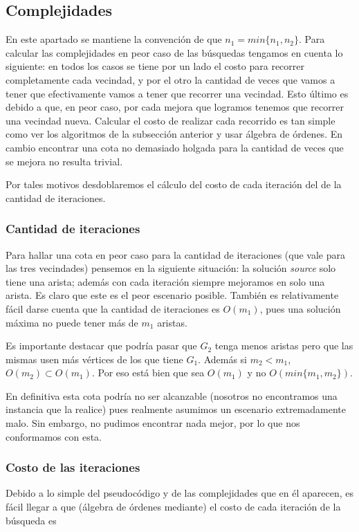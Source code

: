 \subsection{Complejidades}
En este apartado se mantiene la convención de que $n_1 = min\{n_1, n_2\}$.
Para calcular las complejidades en peor caso de las búsquedas tengamos en cuenta lo siguiente: en todos los casos se tiene por un lado el costo para recorrer completamente cada vecindad, y por el otro la cantidad de veces que vamos a tener que efectivamente vamos a tener que recorrer una vecindad. Esto último es debido a que, en peor caso, por cada mejora que logramos tenemos que recorrer una vecindad nueva. Calcular el costo de realizar cada recorrido es tan simple como ver los algoritmos de la subsección anterior y usar álgebra de órdenes. En cambio encontrar una cota no demasiado holgada para la cantidad de veces que se mejora no resulta trivial.

Por tales motivos desdoblaremos el cálculo del costo de cada iteración del de la cantidad de iteraciones.

\subsubsection{Cantidad de iteraciones}
Para hallar una cota en peor caso para la cantidad de iteraciones (que vale para las tres vecindades) pensemos en la siguiente situación: la solución \emph{source} solo tiene una arista; además con cada iteración siempre mejoramos en solo una arista. Es claro que este es el peor escenario posible. También es relativamente fácil darse cuenta que la cantidad de iteraciones es $O(m_1)$, pues una solución máxima no puede tener más de $m_1$ aristas.

Es importante destacar que podría pasar que $G_2$ tenga menos aristas pero que las mismas usen más vértices de los que tiene $G_1$. Además si $m_2 < m_1$, $O(m_2) \subset O(m_1)$. Por eso está bien que sea $O(m_1)$ y no $O(min\{m_1, m_2\})$.

En definitiva esta cota podría no ser alcanzable (nosotros no encontramos una instancia que la realice) pues realmente asumimos un escenario extremadamente malo. Sin embargo, no pudimos encontrar nada mejor, por lo que nos conformamos con esta.

\subsubsection{Costo de las iteraciones}
Debido a lo simple del pseudocódigo y de las complejidades que en él aparecen, es fácil llegar a que (álgebra de órdenes mediante) el costo de cada iteración de la búsqueda es 

